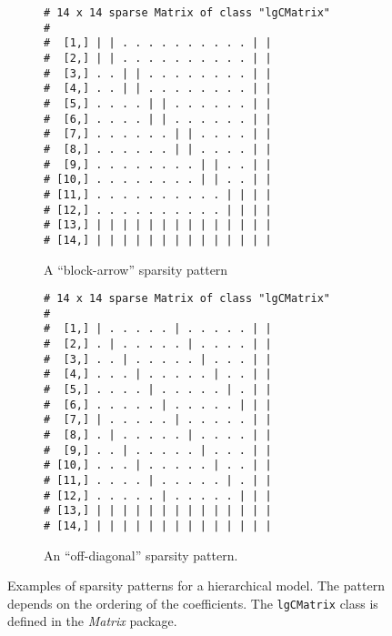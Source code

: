 \documentclass[10pt]{article}\usepackage[]{graphicx}\usepackage[]{color}
\makeatletter
\newenvironment{kframe}{%
 \def\at@end@of@kframe{}%
 \ifinner\ifhmode%
  \def\at@end@of@kframe{\end{minipage}}%
  \begin{minipage}{\columnwidth}%
 \fi\fi%
 \def\FrameCommand##1{\hskip\@totalleftmargin \hskip-\fboxsep
 \colorbox{shadecolor}{##1}\hskip-\fboxsep
     \hskip-\linewidth \hskip-\@totalleftmargin \hskip\columnwidth}%
 \MakeFramed {\advance\hsize-\width
   \@totalleftmargin\z@ \linewidth\hsize
   \@setminipage}}%
 {\par\unskip\endMakeFramed%
 \at@end@of@kframe}
\newenvironment{knitrout}{}{} %
\renewenvironment{knitrout}{\begin{singlespace}}{\end{singlespace}}
\newcommand{\pkg}[1]{\emph{#1}}
\newcommand{\class}[1]{\texttt{#1}}
\makeatother
\begin{document}
\begin{figure}
  \begin{subfigure}[t]{.5\linewidth}
\begin{knitrout}
\color{fgcolor}\begin{kframe}
\begin{verbatim}
# 14 x 14 sparse Matrix of class "lgCMatrix"
#                                  
#  [1,] | | . . . . . . . . . . | |
#  [2,] | | . . . . . . . . . . | |
#  [3,] . . | | . . . . . . . . | |
#  [4,] . . | | . . . . . . . . | |
#  [5,] . . . . | | . . . . . . | |
#  [6,] . . . . | | . . . . . . | |
#  [7,] . . . . . . | | . . . . | |
#  [8,] . . . . . . | | . . . . | |
#  [9,] . . . . . . . . | | . . | |
# [10,] . . . . . . . . | | . . | |
# [11,] . . . . . . . . . . | | | |
# [12,] . . . . . . . . . . | | | |
# [13,] | | | | | | | | | | | | | |
# [14,] | | | | | | | | | | | | | |
\end{verbatim}
\end{kframe}
\end{knitrout}
\caption{A ``block-arrow'' sparsity pattern}\label{fig:pattern1}
\end{subfigure}
\begin{subfigure}[t]{.5\linewidth}
\begin{knitrout}
\color{fgcolor}\begin{kframe}
\begin{verbatim}
# 14 x 14 sparse Matrix of class "lgCMatrix"
#                                  
#  [1,] | . . . . . | . . . . . | |
#  [2,] . | . . . . . | . . . . | |
#  [3,] . . | . . . . . | . . . | |
#  [4,] . . . | . . . . . | . . | |
#  [5,] . . . . | . . . . . | . | |
#  [6,] . . . . . | . . . . . | | |
#  [7,] | . . . . . | . . . . . | |
#  [8,] . | . . . . . | . . . . | |
#  [9,] . . | . . . . . | . . . | |
# [10,] . . . | . . . . . | . . | |
# [11,] . . . . | . . . . . | . | |
# [12,] . . . . . | . . . . . | | |
# [13,] | | | | | | | | | | | | | |
# [14,] | | | | | | | | | | | | | |
\end{verbatim}
\end{kframe}
\end{knitrout}
\caption{An ``off-diagonal'' sparsity pattern.}\label{fig:pattern2}
\end{subfigure}
\caption{Examples of sparsity patterns for a hierarchical model.  The
  pattern depends on the ordering of the coefficients. The
  \class{lgCMatrix} class is defined in the \pkg{Matrix} package.}
\end{figure}
\end{document}
